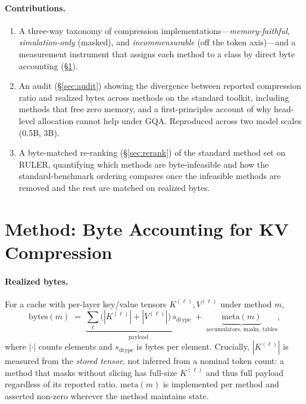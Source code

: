 \documentclass[11pt]{article}
\begin{document}
\paragraph{Contributions.}
\begin{enumerate}
  \item A three-way taxonomy of compression implementations---\emph{memory-faithful},
  \emph{simulation-only} (masked), and \emph{incommensurable} (off the token axis)---and a
  measurement instrument that assigns each method to a class by direct byte accounting
  (\S\ref{sec:method}).
  \item An audit (\S\ref{sec:audit}) showing the divergence between reported compression ratio and
  realized bytes across methods on the standard toolkit, including methods that free zero memory,
  and a first-principles account of why head-level allocation cannot help under GQA. Reproduced
  across two model scales (0.5B, 3B).
  \item A byte-matched re-ranking (\S\ref{sec:rerank}) of the standard method set on RULER,
  quantifying which methods are byte-infeasible and how the standard-benchmark ordering compares
  once the infeasible methods are removed and the rest are matched on realized bytes.
\end{enumerate}



\section{Method: Byte Accounting for KV Compression}
\label{sec:method}

\paragraph{Realized bytes.}
For a cache with per-layer key/value tensors $K^{(\ell)}, V^{(\ell)}$ under method $m$,
\begin{equation}
  \mathrm{bytes}(m) \;=\; \underbrace{\sum_{\ell} \big(|K^{(\ell)}| + |V^{(\ell)}|\big)\,s_{\mathrm{dtype}}}_{\text{payload}}
  \;+\; \underbrace{\mathrm{meta}(m)}_{\text{accumulators, masks, tables}},
\label{eq:bytes}
\end{equation}
where $|\cdot|$ counts elements and $s_{\mathrm{dtype}}$ is bytes per element. Crucially, $|K^{(\ell)}|$
is measured from the \emph{stored tensor}, not inferred from a nominal token count: a method that masks
without slicing has full-size $K^{(\ell)}$ and thus full payload regardless of its reported ratio.
$\mathrm{meta}(m)$ is implemented per method and asserted non-zero wherever the method maintains state.
\end{document}
